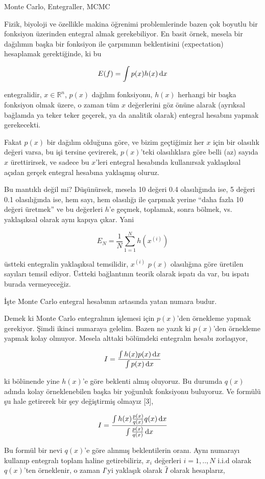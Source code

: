 \documentclass[12pt,fleqn]{article}\usepackage{../../common}
\begin{document}
Monte Carlo, Entegraller, MCMC

Fizik, biyoloji ve özellikle makina öğrenimi problemlerinde bazen çok
boyutlu bir fonksiyon üzerinden entegral almak gerekebiliyor. En basit
örnek, mesela bir dağılımın başka bir fonksiyon ile çarpımının beklentisini
(expectation) hesaplamak gerektiğinde, ki bu

$$ E(f) = \int p(x)h(x) \,\mathrm{d} x $$

entegralidir, $x \in \mathbb{R}^n$, $p(x)$ dağılım fonksiyonu, $h(x)$
herhangi bir başka fonksiyon olmak üzere, o zaman tüm $x$ değerlerini göz
önüne alarak (ayrıksal bağlamda ya teker teker geçerek, ya da analitik
olarak) entegral hesabını yapmak gerekecekti.

Fakat $p(x)$ bir dağılım olduğuna göre, ve bizim geçtiğimiz her $x$ için
bir olasılık değeri varsa, bu işi tersine çevirerek, $p(x)$'teki
olasılıklara göre belli (az) sayıda $x$ ürettirirsek, ve sadece bu $x$'leri
entegral hesabında kullanırsak yaklaşıksal açıdan gerçek entegral hesabına
yaklaşmış oluruz. 

Bu mantıklı değil mi? Düşünürsek, mesela 10 değeri 0.4 olasılığında ise, 5
değeri 0.1 olasılığında ise, hem sayı, hem olasılığı ile çarpmak yerine
``daha fazla 10 değeri üretmek'' ve bu değerleri $h$'e geçmek, toplamak,
sonra bölmek, vs. yaklaşıksal olarak aynı kapıya çıkar. Yani

$$ E_N = \frac{1}{N}\sum_{1=1}^N h(x^{(i)}) $$

üstteki entegralin yaklaşıksal temsilidir, $x^{(i)}$ $p(x)$ olasılığına
göre üretilen sayıları temsil ediyor. Üstteki bağlantının teorik olarak
ispatı da var, bu ispatı burada vermeyeceğiz. 

İşte Monte Carlo entegral hesabının artasında yatan numara budur. 

Demek ki Monte Carlo entegralının işlemesi için $p(x)$'den örnekleme yapmak
gerekiyor. Şimdi ikinci numaraya gelelim.  Bazen ne yazık ki $p(x)$'den
örnekleme yapmak kolay olmuyor. Mesela alttaki bölümdeki entegralın hesabı
zorlaşıyor,

$$ I = \frac{\int h(x) p(x) \,\mathrm{d} x}{\int p(x) \,\mathrm{d} x} $$

ki bölünende yine $h(x)$'e göre beklenti almış oluyoruz. Bu durumda $q(x)$
adında kolay örneklenebilen başka bir yoğunluk fonksiyonu buluyoruz. Ve formülü
şu hale getirerek bir şey değiştirmiş olmayız [3],

$$ I = \frac
{\int h(x) \frac{p(x)}{q(x)} q(x) \,\mathrm{d} x}
{\int \frac{p(x)}{q(x)} \,\mathrm{d} x}
$$

Bu formül bir nevi $q(x)$'e göre alınmış beklentilerin oranı. Aynı numarayı
kullanıp entegralı toplam haline getirebiliriz, $x_i$ değerleri $i=1,..,N$ i.i.d
olarak $q(x)$'ten örneklenir, o zaman $I$'yi yaklaşık olarak $\hat{I}$ olarak
hesaplarız,
\end{document}
